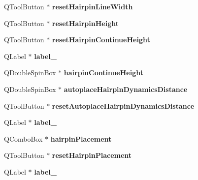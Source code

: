 \begin{DoxyCompactItemize}
Q\+Tool\+Button $\ast$ {\bfseries reset\+Hairpin\+Line\+Width}
\item 
\mbox{\label{class_ui___edit_style_base_a227b6a8847f398e4d04e655f7d8de1b5}} 
Q\+Tool\+Button $\ast$ {\bfseries reset\+Hairpin\+Height}
\item 
\mbox{\label{class_ui___edit_style_base_ad2a83e8e42b08b24f93a79a24d447652}} 
Q\+Tool\+Button $\ast$ {\bfseries reset\+Hairpin\+Continue\+Height}
\item 
\mbox{\label{class_ui___edit_style_base_a5059fff47558da48891271a5fe715ca7}} 
Q\+Label $\ast$ {\bfseries label\+\_}
\item 
\mbox{\label{class_ui___edit_style_base_ab308ae6ffd129c50457c5d47d07b0c4c}} 
Q\+Double\+Spin\+Box $\ast$ {\bfseries hairpin\+Continue\+Height}
\item 
\mbox{\label{class_ui___edit_style_base_ab7aa3ca9925e1d2f617b3435741d5102}} 
Q\+Double\+Spin\+Box $\ast$ {\bfseries autoplace\+Hairpin\+Dynamics\+Distance}
\item 
\mbox{\label{class_ui___edit_style_base_ab289afccb48619c070a0c64c998ae9d5}} 
Q\+Tool\+Button $\ast$ {\bfseries reset\+Autoplace\+Hairpin\+Dynamics\+Distance}
\item 
\mbox{\label{class_ui___edit_style_base_ad7d68d4c0c693b58a153fec7da93c139}} 
Q\+Label $\ast$ {\bfseries label\+\_}
\item 
\mbox{\label{class_ui___edit_style_base_a557e89308acaf47e117cd442f17e09c2}} 
Q\+Combo\+Box $\ast$ {\bfseries hairpin\+Placement}
\item 
\mbox{\label{class_ui___edit_style_base_a41a0de40b0a2975aec095fd522947419}} 
Q\+Tool\+Button $\ast$ {\bfseries reset\+Hairpin\+Placement}
\item 
\mbox{\label{class_ui___edit_style_base_a7d24d8e7189ca1f671962aa7cffec6c4}} 
Q\+Label $\ast$ {\bfseries label\+\_}

\end{DoxyCompactItemize}
